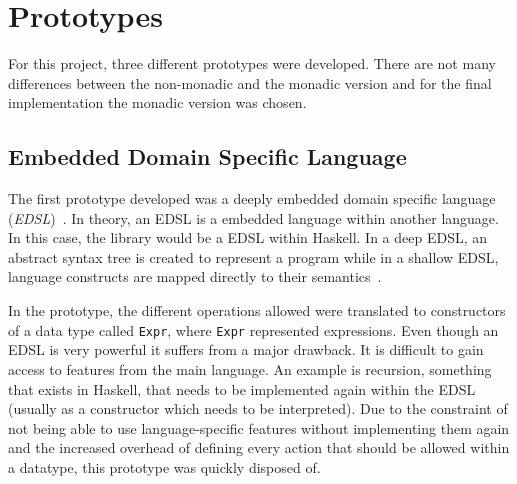 \chapter{Prototypes}
\label{chapter:prototypes}
For this project, three different prototypes were developed. There are not many differences between the non-monadic and the monadic version and for the final implementation the monadic version was chosen.
\section{Embedded Domain Specific Language}
The first prototype developed was a deeply embedded domain specific language (\emph{EDSL})~\cite{haskell_edsl}. In theory, an EDSL is a embedded language within another language. In this case, the library would be a EDSL within Haskell. In a deep EDSL, an abstract syntax tree is created to represent a program while in a shallow EDSL, language constructs are mapped directly to their semantics~\cite{haskell-deep-shallow}.

In the prototype, the different operations allowed were translated to constructors of a data type called {\tt Expr}, where {\tt Expr} represented expressions. Even though an EDSL is very powerful it suffers from a major drawback. It is difficult to gain access to features from the main language. An example is recursion, something that exists in Haskell, that needs to be implemented again within the EDSL (usually as a constructor which needs to be interpreted). Due to the constraint of not being able to use language-specific features without implementing them again and the increased overhead of defining every action that should be allowed within a datatype, this prototype was quickly disposed of.

